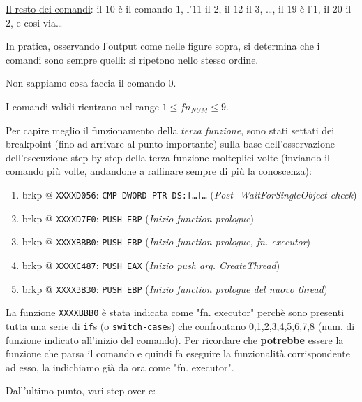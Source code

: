 \documentclass[
    a4paper, %
    11pt %
]{article}
\begin{document}
            \underline{Il resto dei comandi}: 
            il $10$ è il comando $1$, l'$11$ il $2$, il $12$ il $3$, \dots, il $19$ è 
            l'$1$, il $20$ il $2$, e cosi via\dots

            In pratica, osservando l'output come nelle figure sopra, si determina che i comandi sono sempre
            quelli: si ripetono nello stesso ordine.

            Non sappiamo cosa faccia il comando $0$.
            
            I comandi validi rientrano nel range $1 \le fn_{NUM} \le 9$.

            Per capire meglio il funzionamento della \textit{terza funzione}, sono stati settati dei breakpoint (fino ad 
            arrivare al punto importante) sulla base dell'osservazione dell'esecuzione step by step della 
            terza funzione molteplici volte (inviando il comando più volte, andandone a raffinare sempre
            di più la conoscenza):

            \begin{enumerate}
                \item brkp @ \texttt{XXXXD056}: \texttt{CMP DWORD PTR DS:[\dots]\dots} (\textit{Post-      
                    WaitForSingleObject check})
                \item brkp @ \texttt{XXXXD7F0}: \texttt{PUSH EBP} (\textit{Inizio function prologue})
                \item brkp @ \texttt{XXXXBBB0}: \texttt{PUSH EBP} (\textit{Inizio function prologue, fn. executor})
                \item brkp @ \texttt{XXXXC487}: \texttt{PUSH EAX} (\textit{Inizio push arg. CreateThread})
                \item brkp @ \texttt{XXXX3B30}: \texttt{PUSH EBP} (\textit{Inizio function prologue del nuovo thread})
            \end{enumerate}

            La funzione \texttt{XXXXBBB0} è stata indicata come "fn. executor" perchè sono presenti tutta
            una serie di \texttt{if}s (o \texttt{switch-case}s) che confrontano 0,1,2,3,4,5,6,7,8 (num. di funzione indicato all'inizio del comando). Per ricordare
            che \textbf{potrebbe} essere la funzione che parsa il comando e quindi fa eseguire la funzionalità
            corrispondente ad esso, la indichiamo già da ora come "fn. executor".

            Dall'ultimo punto, vari step-over e:
\end{document}
